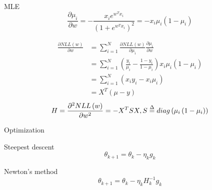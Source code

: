 \documentclass[xetex,mathserif,serif]{beamer}
\begin{document}
\begin{frame}{MLE}
\[\frac{{\partial {\mu _i}}}{{\partial w}} =  - \frac{{{x_i}{e^{{w^T}{x_i}}}}}{{{{\left( {1 + {e^{{w^T}{x_i}}}} \right)}^2}}} =  - {x_i}{\mu _i}\left( {1 - {\mu _i}} \right)\]

\begin{equation*}
\begin{aligned} %
    \frac{{\partial NLL\left( w \right)}}{{\partial w}}
    & = \sum\limits_{i = 1}^N {\frac{{\partial NLL\left( w \right)}}{{\partial {\mu _i}}}} \frac{{\partial {\mu _i}}}{{\partial w}} \\
    & = \sum\limits_{i = 1}^N {\left( {\frac{{{y_i}}}{{{\mu _i}}} - \frac{{1 - {y_i}}}{{1 - {\mu _i}}}} \right){x_i}} {\mu _i}\left( {1 - {\mu _i}} \right)\\
     &　= \sum\limits_{i = 1}^N {\left( {{x_i}{y_i} - {x_i}{\mu _i}} \right)} \\
     &  = {X^T}\left( {\mu  - y} \right)
\end{aligned}
\end{equation*}
\[H = \frac{{{\partial ^2}NLL\left( w \right)}}{{\partial {w^2}}} = -{X^T}SX,S \buildrel \Delta \over = diag\left( {{\mu _i}\left( {1 - {\mu _i}} \right)} \right)\]
\end{frame}

\begin{frame}{Optimization}
    \begin{block}{Steepest descent}
    \[{\theta _{k + 1}} = {\theta _k} - {\eta _k}{g_k}\]
    \end{block}

    \begin{block}{Newton's method}
    \[{\theta _{k + 1}} = {\theta _k} - {\eta _k}H_k^{ - 1}{g_k}\]
    \end{block}
\end{frame}
\end{document}
